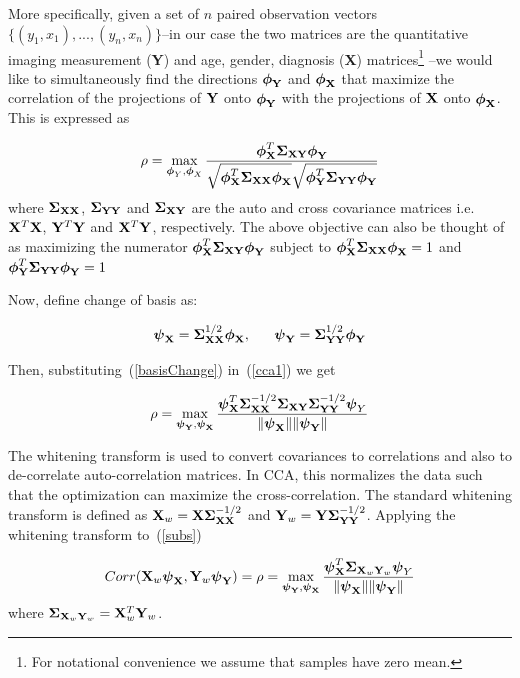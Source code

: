 \documentclass{llncs}
\newcommand{\X}{{\bf X}}
\newcommand{\Y}{{\bf Y}}
\newcommand{\bs}{\boldsymbol}
\begin{document}
More specifically, given a set of $n$ paired observation vectors
$\{(y_1,x_1),...,(y_n,x_n)\}$--in our case the two matrices are the
quantitative imaging measurement ({\Y}) and age, gender, diagnosis ({\X}) matrices\footnote{For
  notational convenience we assume that samples have zero mean.} --we would like to simultaneously find the directions
${\bs{\bs\phi_{\Y}}}$ and
${\bs{\bs\phi_{\X}}}$ that maximize the correlation of
the projections of ${\Y}$ onto ${\bs{\bs\phi_{\Y}}}$
with the projections of ${\X}$ onto
${\bs{\bs\phi_{\X}}}$. This is expressed as

\begin{equation}
\label{cca1}
\rho=\max_{{\bs\phi_Y}, {\bs\phi_X}}
\frac{{\bs\phi_{\X}^T\bs\Sigma_{\X\Y}}\bs\phi_{\Y}}{\sqrt{\bs\phi_{\X}^T\bs\Sigma_{\X\X}\bs\phi_{\X}}\sqrt{\bs\phi_{\Y}^T\bs\Sigma_{\Y\Y}\bs\phi_{\Y}}}
\end{equation}
where ${\bs\Sigma_{\X\X}}$, ${\bs\Sigma_{\Y\Y}}$ and ${\bs\Sigma_{\X\Y}}$ are the auto and cross covariance matrices i.e. $\X^T\X$, $\Y^T\Y$ and $\X^T\Y$, respectively. The above objective can also be thought of as maximizing the numerator $\bs\phi_{\X}^T\bs\Sigma_{\X\Y}\bs\phi_{\Y}$ subject to $\bs\phi_{\X}^T\bs\Sigma_{\X\X}\bs\phi_{\X} =1$ and $\bs\phi_{\Y}^T\bs\Sigma_{\Y\Y}\bs\phi_{\Y}=1$

Now, define change of basis as:

\begin{equation}
\label{basisChange}
\bs\psi_{\X} = \bs\Sigma_{\X\X}^{1/2}\bs\phi_{\X}, \;\;\;\;\;\;   \bs\psi_{\Y} = \bs\Sigma_{\Y\Y}^{1/2}\bs\phi_{\Y} 
\end{equation}

Then, substituting~(\ref{basisChange}) in~(\ref{cca1}) we get 

\begin{equation}
\label{subs}
\rho= \max_{{\bs\psi_{\Y}}, {\bs\psi_{\X}}} \frac{\bs\psi_{\X}^T \bs\Sigma_{\X\X}^{-1/2}\bs\Sigma_{\X\Y}\bs\Sigma_{\Y\Y}^{-1/2}\bs\psi_Y}{\|\bs\psi_{\X}\| \|\bs\psi_{\Y}\|}
\end{equation}

The whitening transform is used to convert covariances to correlations
and also to de-correlate auto-correlation matrices.  In CCA, this
normalizes the data such that the optimization can maximize the
cross-correlation.  The standard whitening transform is defined as
$\X_w= \X\bs\Sigma_{\X\X}^{-1/2}$ and $\Y_w=
\Y\bs\Sigma_{\Y\Y}^{-1/2}$.  Applying the whitening transform
to~(\ref{subs})

\begin{equation}
\label{simplifiedcca}
Corr(\X_w\bs\psi_{\X},\Y_w\bs\psi_{\Y})=\rho=\max_{{\bs\psi_{\Y}}, {\bs\psi_{\X}}} \frac{\bs\psi_{\X}^T \bs\Sigma_{\X_w\Y_w}\bs\psi_Y}{\|\bs\psi_{\X}\| \|\bs\psi_{\Y}\|}
\end{equation}
where $\bs\Sigma_{\X_w\Y_w} = \X_w^T\Y_w$. 
\end{document}
